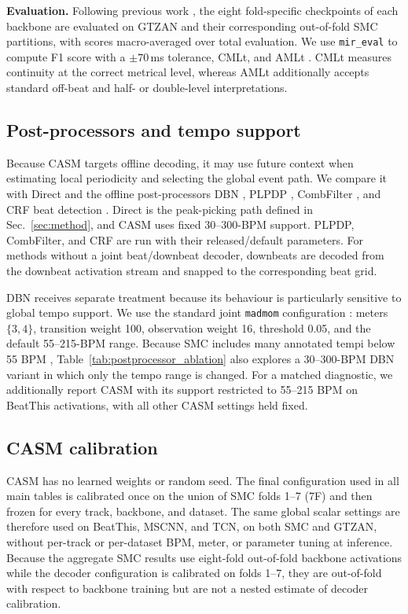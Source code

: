 \documentclass{article}
\begin{document}
\textbf{Evaluation.} Following previous work \cite{foscarin2024beat}, the eight fold-specific checkpoints of each backbone are evaluated on GTZAN and their corresponding out-of-fold SMC partitions, with scores macro-averaged over total evaluation. We use \texttt{mir\_eval} to compute F1 score with a $\pm70$\,ms tolerance, CMLt, and AMLt \cite{raffel2014mireval}. CMLt measures continuity at the correct metrical level, whereas AMLt additionally accepts standard off-beat and half- or double-level interpretations.

\subsection{Post-processors and tempo support}
Because CASM targets offline decoding, it may use future context when estimating
local periodicity and selecting the global event path. We compare it with Direct
and the offline post-processors DBN \cite{krebs2015dbn}, PLPDP
\cite{chiu2023localperiodicity}, CombFilter \cite{bock2015combfilter}, and CRF
beat detection \cite{korzeniowski2014crf}. Direct is the peak-picking path defined
in Sec.~\ref{sec:method}, and CASM uses fixed 30--300-BPM support. PLPDP,
CombFilter, and CRF are run with their released/default parameters. For methods
without a joint beat/downbeat decoder, downbeats are decoded from the downbeat
activation stream and snapped to the corresponding beat grid.

DBN receives separate treatment because its behaviour is particularly sensitive to global tempo support. We use the standard joint \texttt{madmom} configuration \cite{krebs2015dbn}: meters $\{3,4\}$, transition weight 100, observation weight 16, threshold 0.05, and the default 55--215-BPM range. Because SMC includes many annotated tempi below 55 BPM \cite{ahn2026smcblindspot}, Table~\ref{tab:postprocessor_ablation} also explores a 30--300-BPM DBN variant in which only the tempo range is changed. For a matched diagnostic, we additionally report CASM with its support restricted to 55--215 BPM on BeatThis activations, with all other CASM settings held fixed.

\subsection{CASM calibration}
CASM has no learned weights or random seed. The final configuration used in all main tables is calibrated once on the union of SMC folds 1--7 (7F) and then frozen for every track, backbone, and dataset. The same global scalar settings are therefore used on BeatThis, MSCNN, and TCN, on both SMC and GTZAN, without per-track or per-dataset BPM, meter, or parameter tuning at inference. Because the aggregate SMC results use eight-fold out-of-fold backbone activations while the decoder configuration is calibrated on folds 1--7, they are out-of-fold with respect to backbone training but are not a nested estimate of decoder calibration.
\end{document}
